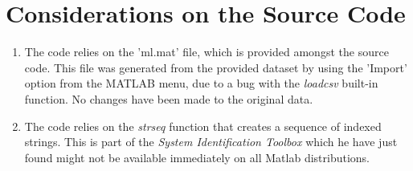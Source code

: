\chapter{Considerations on the Source Code}
\label{ch:appAlabel}

\begin{enumerate}
\item The code relies on the 'ml.mat' file, which is provided amongst the source code. This file was generated from the provided dataset by using the 'Import' option from the MATLAB menu, due to a bug with the \textit{loadcsv} built-in function. No changes have been made to the original data.
\item The code relies on the \textit{strseq} function that creates a sequence of indexed strings. This is part of the \textit{System Identification Toolbox} which he have just found might not be available immediately on all Matlab distributions.
\end{enumerate}